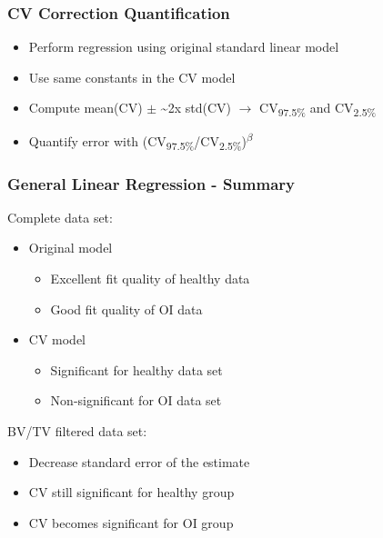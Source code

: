 \documentclass[xcolor=table]{beamer}
\begin{document}
\begin{frame}
	\frametitle{CV Correction Quantification}
	\begin{itemize}
		\item Perform regression using original standard linear model
		\item Use same constants in the CV model
		\item Compute mean(CV) $\pm$ \textasciitilde 2x std(CV) $\rightarrow$ CV\textsubscript{97.5\%} and CV\textsubscript{2.5\%}
		\item Quantify error with (CV\textsubscript{97.5\%}/CV\textsubscript{2.5\%})\textsuperscript{$\beta$}
	\end{itemize}
	
	\begin{table}[h!]\caption{CV error correction}
	\end{table}
\end{frame}




\begin{frame}
	\frametitle{General Linear Regression - Summary}
	Complete data set:
	\begin{itemize}
		\item Original model
		\begin{itemize}
			\item Excellent fit quality of healthy data
			\item Good fit quality of OI data
		\end{itemize} 
		\item CV model
		\begin{itemize}
			\item Significant for healthy data set
			\item Non-significant for OI data set
		\end{itemize}
	\end{itemize}
	\vspace{0.25cm}
	BV/TV filtered data set:
	\begin{itemize}
		\item Decrease standard error of the estimate
		\item CV still significant for healthy group
		\item CV becomes significant for OI group
	\end{itemize} 

\end{frame}
\end{document}
